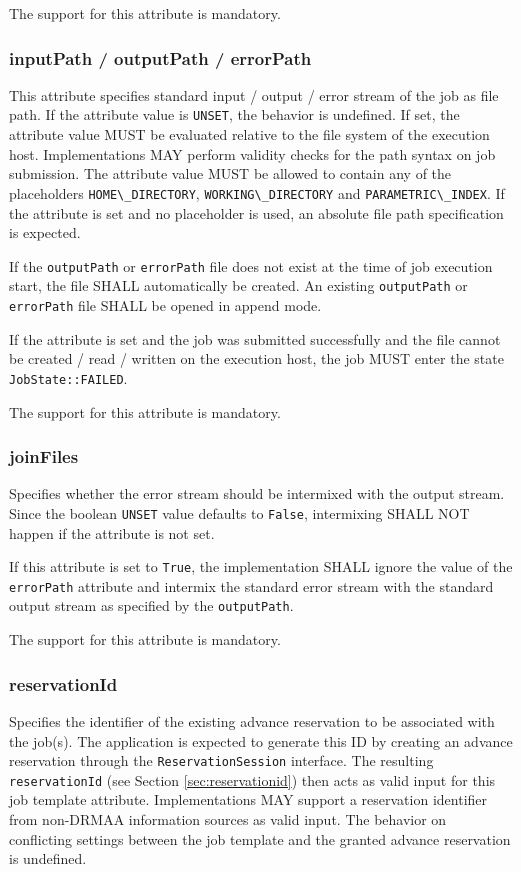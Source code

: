 \documentclass{article}
\newcommand{\h}[1]{\lstinline|#1|}
\begin{document}
The support for this attribute is mandatory.

\subsubsection{inputPath / outputPath / errorPath}

This attribute specifies standard input / output / error stream of the job as file path. If the attribute value is \h{UNSET}, the behavior is undefined. If set, the attribute value MUST be evaluated relative to the file system of the execution host. Implementations MAY perform validity checks for the path syntax on job submission. The attribute value MUST be allowed to contain any of the placeholders \h{HOME\_DIRECTORY}, \h{WORKING\_DIRECTORY} and \h{PARAMETRIC\_INDEX}. If the attribute is set and no placeholder is used, an absolute file path specification is expected. 

If the \h{outputPath} or \h{errorPath} file does not exist at the time of job execution start, the file SHALL automatically be created. An existing \h{outputPath} or \h{errorPath} file SHALL be opened in append mode.

If the attribute is set and the job was submitted successfully and the file cannot be created / read / written on the execution host, the job MUST enter the state \h{JobState::FAILED}.

The support for this attribute is mandatory.

\subsubsection{joinFiles}

Specifies whether the error stream should be intermixed with the output stream. Since the boolean \h{UNSET} value defaults to \h{False}, intermixing SHALL NOT happen if the attribute is not set. 

If this attribute is set to \h{True}, the implementation SHALL ignore the value of the \h{errorPath} attribute and intermix the standard error stream with the standard output stream as specified by the \h{outputPath}.

The support for this attribute is mandatory.

\subsubsection{reservationId}

Specifies the identifier of the existing advance reservation to be associated with the job(s). The application is expected to generate this ID by creating an advance reservation through the \h{ReservationSession} interface. The resulting \h{reservationId} (see Section \ref{sec:reservationid}) then acts as valid input for this job template attribute. Implementations MAY support a reservation identifier from non-DRMAA information sources as valid input. The behavior on conflicting settings between the job template and the granted advance reservation is undefined.
\end{document}
